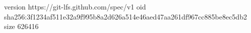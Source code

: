 version https://git-lfs.github.com/spec/v1
oid sha256:3f1234af511e32a9f995b8a2d626a514e46aed47aa261df967cc885be8ec5db2
size 626416
